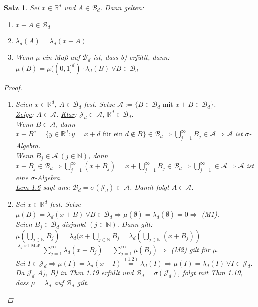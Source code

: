 \documentclass[a4paper]{scrreprt}
\newcommand{\R}{\mathbb{R}}
\newcommand{\N}{\mathbb{N}}
\newcommand{\Borel}{\mathcal{B}}
\newcommand{\Bd}{\Borel_d}
\newcommand{\Jd}{\mathcal{J}_d}
\newcommand{\jlabel}[1]{\label{j_#1}}
\newcommand{\jhyperref}[2]{\hyperref[j_#1]{#2}}
\newcommand{\jlink}[1]{\jhyperref{#1}{#1}}
\theoremstyle{plain}
\newtheorem{satz}[thm]{Satz}
\theoremstyle{definition}
\begin{document}
{{{\begin{satz}
\jlabel{Satz 1.24}
    Sei $x \in \R^d$ und $A\in \Bd$. Dann gelten:
    \begin{enumerate}
        \item $x + A \in \Bd$
        \item $\lambda_d(A) = \lambda_d(x + A)$
        \item 
            Wenn $\mu$ ein Maß auf $\Bd$ ist, dass b) erfüllt, dann:\\
            $\mu(B) = \mu((0,1]^d)\cdot \lambda_d(B) \ \forall B \in \Bd$
    \end{enumerate}
    \begin{proof}
        \begin{enumerate}
            \item
                Seien $x \in \R^d, \ A\in \Bd$ fest. Setze $\mathcal{A} := \{B\in \Bd \text{ mit } x + B \in \Bd\}$.\\
                \uline{Zeige}: $A\in\mathcal{A}$. \uline{Klar}: $\Jd \subset \mathcal{A},\ \R^d \in \Bd$.\\
                Wenn $B\in\mathcal{A}$, dann $x+B^c = \{y\in \R^d : y = x+d \text{ für ein } d \notin B\} \in \Bd \Rightarrow \bigcup_{j=1}^\infty B_j \in \mathcal{A} \Rightarrow \mathcal{A}$ ist $\sigma$-Algebra.\\
                Wenn $B_j \in \mathcal{A} \ (j\in\N)$, dann $x+B_j \in \Bd \Rightarrow \bigcup_{j=1}^\infty (x+B_j) = x + \bigcup_{j=1}^\infty B_j \in \Bd \Rightarrow \bigcup_{j=1}^\infty \in \mathcal{A} \Rightarrow \mathcal{A}$ ist eine $\sigma$-Algebra.\\
                \jlink{Lem 1.6} sagt uns: $\Bd = \sigma(\Jd)\subset \mathcal{A}$. Damit folgt $A\in \mathcal{A}$.
                
            \item
                Sei $x \in \R^d$ fest. Setze $\mu(B) = \lambda_d(x+B) \ \forall B\in \Bd \Rightarrow \mu(\emptyset) = \lambda_d(\emptyset) = 0 \Rightarrow$ (M1).\\
                Seien $B_j \in \Bd$ disjunkt $(j\in\N)$. Dann gilt:\\
                $\mu(\bigcup_{j\in\N} B_j) = \lambda_d(x + \bigcup_{j\in\N} B_j = \lambda_d(\bigcup_{j\in\N} (x + B_j)) $\\
                $\overset{\text{$\lambda_d$ ist Maß}}{=} \sum_{j=1}^\infty \lambda_d(x + B_j) = \sum_{j=1}^\infty \mu(B_j) \Rightarrow$ (M2) gilt für $\mu$.\\
                Sei $I\in \Jd \Rightarrow \mu(I) = \lambda_d(x+I) \overset{\jlink{(1.2)}}{=} \lambda_d(I) \Rightarrow \mu(I) = \lambda_d(I) \ \forall I \in \Jd$. Da $\Jd$ A), B) in \jlink{Thm 1.19} erfüllt und $\Bd = \sigma(\Jd)$, folgt mit \jlink{Thm 1.19}, dass $\mu = \lambda_d$ auf $\Bd$ gilt.
                

\end{enumerate}
\end{proof}
\end{satz}}}}
\end{document}
